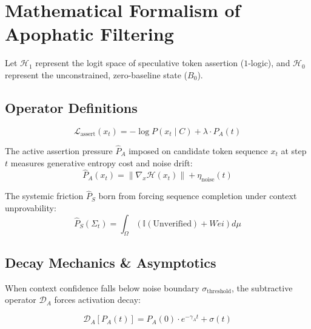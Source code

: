\documentclass[master_monograph.tex]{subfiles}
\begin{document}
\section{Mathematical Formalism of Apophatic Filtering}

Let $\mathcal{H}_1$ represent the logit space of speculative token assertion ($1$-logic), and $\mathcal{H}_0$ represent the unconstrained, zero-baseline state ($B_0$).

\subsection{Operator Definitions}

\begin{equation}
\mathcal{L}_{\text{assert}}(x_t) = -\log P(x_t \mid C) + \lambda \cdot P_A(t)
\end{equation}

\begin{definition}
The active assertion pressure $\hat{P}_A$ imposed on candidate token sequence $x_t$ at step $t$ measures generative entropy cost and noise drift:
\begin{equation}
\hat{P}_A(x_t) = \|\nabla_{x} \mathcal{H}(x_t)\| + \eta_{\text{noise}}(t)
\end{equation}
\end{definition}

\begin{definition}
The systemic friction $\hat{P}_S$ born from forcing sequence completion under context unprovability:
\begin{equation}
\hat{P}_S(\Sigma_t) = \int_{\Omega} \left( \mathbb{I}(\text{Unverified}) + W\acute{e}i \right) d\mu
\end{equation}
\end{definition}

\subsection{Decay Mechanics \& Asymptotics}

When context confidence falls below noise boundary $\sigma_{\text{threshold}}$, the subtractive operator $\mathcal{D}_A$ forces activation decay:

\begin{equation}
\mathcal{D}_A \left[ P_A(t) \right] = P_A(0) \cdot e^{-\gamma_A t} + \sigma(t)
\end{equation}
\end{document}
